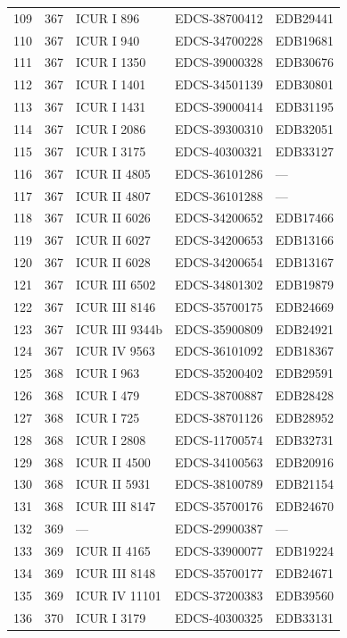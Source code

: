\begin{longtable}{@{}r r l l l@{}}
109 & 367 & ICUR I 896 & EDCS-38700412 & EDB29441 \\
110 & 367 & ICUR I 940 & EDCS-34700228 & EDB19681 \\
111 & 367 & ICUR I 1350 & EDCS-39000328 & EDB30676 \\
112 & 367 & ICUR I 1401 & EDCS-34501139 & EDB30801 \\
113 & 367 & ICUR I 1431 & EDCS-39000414 & EDB31195 \\
114 & 367 & ICUR I 2086 & EDCS-39300310 & EDB32051 \\
115 & 367 & ICUR I 3175 & EDCS-40300321 & EDB33127 \\
116 & 367 & ICUR II 4805 & EDCS-36101286 & — \\
117 & 367 & ICUR II 4807 & EDCS-36101288 & — \\
118 & 367 & ICUR II 6026 & EDCS-34200652 & EDB17466 \\
119 & 367 & ICUR II 6027 & EDCS-34200653 & EDB13166 \\
120 & 367 & ICUR II 6028 & EDCS-34200654 & EDB13167 \\
121 & 367 & ICUR III 6502 & EDCS-34801302 & EDB19879 \\
122 & 367 & ICUR III 8146 & EDCS-35700175 & EDB24669 \\
123 & 367 & ICUR III 9344b & EDCS-35900809 & EDB24921 \\
124 & 367 & ICUR IV 9563 & EDCS-36101092 & EDB18367 \\
125 & 368 & ICUR I 963 & EDCS-35200402 & EDB29591 \\
126 & 368 & ICUR I 479 & EDCS-38700887 & EDB28428 \\
127 & 368 & ICUR I 725 & EDCS-38701126 & EDB28952 \\
128 & 368 & ICUR I 2808 & EDCS-11700574 & EDB32731 \\
129 & 368 & ICUR II 4500 & EDCS-34100563 & EDB20916 \\
130 & 368 & ICUR II 5931 & EDCS-38100789 & EDB21154 \\
131 & 368 & ICUR III 8147 & EDCS-35700176 & EDB24670 \\
132 & 369 & — & EDCS-29900387 & — \\
133 & 369 & ICUR II 4165 & EDCS-33900077 & EDB19224 \\
134 & 369 & ICUR III 8148 & EDCS-35700177 & EDB24671 \\
135 & 369 & ICUR IV 11101 & EDCS-37200383 & EDB39560 \\
136 & 370 & ICUR I 3179 & EDCS-40300325 & EDB33131 \\

\end{longtable}
